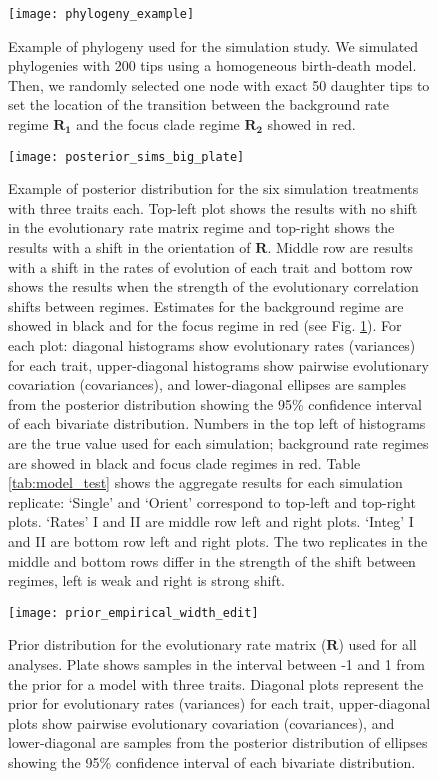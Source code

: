 \begin{figure}[h]
	\centering
	\texttt{[image: phylogeny\_example]}
	\caption[Example of phylogeny used for the simulation study.]{Example of phylogeny used for the simulation study. We simulated phylogenies with 200 tips using a homogeneous birth-death model. Then, we randomly selected one node with exact 50 daughter tips to set the location of the transition between the background rate regime $\mathbf{R_{1}}$ and the focus clade regime $\mathbf{R_{2}}$ showed in red.}
	\label{fig:phylogeny_sims}
\end{figure}

\begin{figure}[h]
	\centering
	\texttt{[image: posterior\_sims\_big\_plate]}
	\caption[Example of posterior distribution for the six simulation treatments with three traits each.]{Example of posterior distribution for the six simulation treatments with three traits each. Top-left plot shows the results with no shift in the evolutionary rate matrix regime and top-right shows the results with a shift in the orientation of $\mathbf{R}$. Middle row are results with a shift in the rates of evolution of each trait and bottom row shows the results when the strength of the evolutionary correlation shifts between regimes. Estimates for the background regime are showed in black and for the focus regime in red (see Fig. \ref{fig:phylogeny_sims}). For each plot: diagonal histograms show evolutionary rates (variances) for each trait, upper-diagonal histograms show pairwise evolutionary covariation (covariances), and lower-diagonal ellipses are samples from the posterior distribution showing the 95\% confidence interval of each bivariate distribution. Numbers in the top left of histograms are the true value used for each simulation; background rate regimes are showed in black and focus clade regimes in red. Table \ref{tab:model_test} shows the aggregate results for each simulation replicate: `Single' and `Orient' correspond to top-left and top-right plots. `Rates' I and II are middle row left and right plots. `Integ' I and II are bottom row left and right plots. The two replicates in the middle and bottom rows differ in the strength of the shift between regimes, left is weak and right is strong shift.}
	\label{fig:posterior_sims}
\end{figure}

\begin{figure}[h]
	\centering
	\texttt{[image: prior\_empirical\_width\_edit]}
	\caption[Prior distribution for the evolutionary rate matrix ($\mathbf{R}$) used for all analyses.]{Prior distribution for the evolutionary rate matrix ($\mathbf{R}$) used for all analyses. Plate shows samples in the interval between -1 and 1 from the prior for a model with three traits. Diagonal plots represent the prior for evolutionary rates (variances) for each trait, upper-diagonal plots show pairwise evolutionary covariation (covariances), and lower-diagonal are samples from the posterior distribution of ellipses showing the 95\% confidence interval of each bivariate distribution.}
	\label{fig:prior}
\end{figure}

